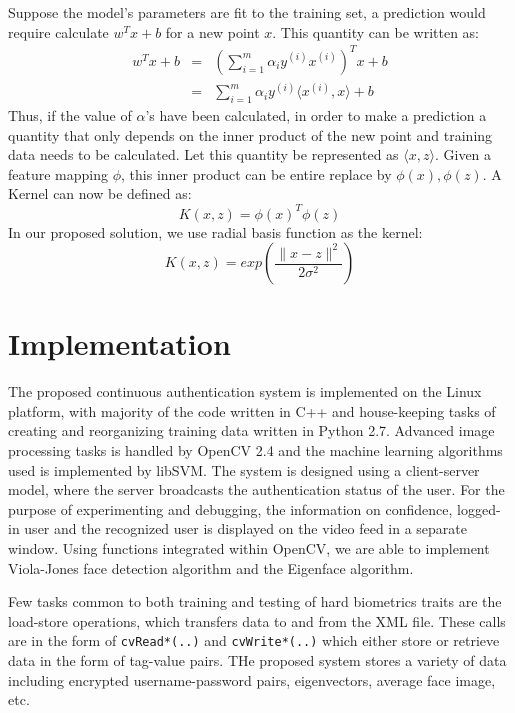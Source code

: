 \documentclass[%
        final,
        notitlepage,
        narroweqnarray,
        inline,
        ]{ieee}
\begin{document}
Suppose the model's parameters are fit to the training set, a prediction would require calculate $w^Tx+b$ for a new point $x$. 
This quantity can be written as:
\begin{eqnarray}
w^Tx + b & = & \left( \sum_{i=1}^{m}\alpha_{i} y^{(i)} x^{(i)} \right)^Tx + b \\
         & = & \sum_{i=1}^{m} \alpha_{i}y^{(i)}\langle x^{(i)},x\rangle + b
\end{eqnarray}
Thus, if the value of $\alpha$'s have been calculated, in order to make a prediction a quantity that only depends on the inner product of the new point and training data needs to be calculated.
Let this quantity be represented as $\langle x, z\rangle$.
Given a feature mapping $\phi$, this inner product can be entire replace by $\phi(x),\phi(z)$.
A Kernel can now be defined as:
\begin{equation}
K(x,z) = \phi(x)^T\phi(z)
\end{equation}
In our proposed solution, we use radial basis function as the kernel:
\begin{equation}
K(x,z) = exp\left( \frac {\parallel x - z \parallel ^2} {2\sigma^2} \right)
\end{equation}


\section{Implementation}
The proposed continuous authentication system is implemented on the Linux platform, with majority of the code written in C++ and house-keeping tasks of creating and reorganizing training data written in Python 2.7.
Advanced image processing tasks is handled by OpenCV 2.4\cite{opencv} and the machine learning algorithms used is implemented by libSVM\cite{libsvm}.
The system is designed using a client-server model, where the server broadcasts the authentication status of the user.
For the purpose of experimenting and debugging, the information on confidence, logged-in user and the recognized user is displayed on the video feed in a separate window.
Using functions integrated within OpenCV, we are able to implement Viola-Jones face detection algorithm and the Eigenface algorithm.

Few tasks common to both training and testing of hard biometrics traits are the load-store operations, which transfers data to and from the XML file.
These calls are in the form of \verb+cvRead*(..)+ and \verb+cvWrite*(..)+ which either store or retrieve data in the form of tag-value pairs.
THe proposed system stores a variety of data including encrypted username-password pairs, eigenvectors, average face image, etc. 
\end{document}
